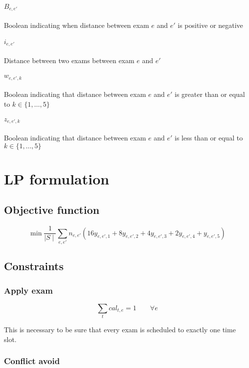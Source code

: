 \documentclass[11pt, a4paper, leqno]{article}
\begin{document}
	\paragraph{$B_{e,e'}$} Boolean indicating when distance between exam $e$ and $e'$ is positive or negative
	
	\paragraph{$i_{e,e'}$} Distance between two exams between exam $e$ and $e'$
	
	\paragraph{$w_{e,e',k}$} Boolean indicating that distance between exam $e$ and $e'$ is greater than or equal to $k \in \{1,\dots,5\}$ %
	
	\paragraph{$z_{e,e',k}$} Boolean indicating that distance between exam $e$ and $e'$ is less than or equal to $k \in \{1,\dots,5\}$
	
	\section{LP formulation}
	
	\subsection{Objective function}
	
	\[
		\min\frac{1}{\mid S\mid}\sum_{e,e'} n_{e,e'}\left(16y_{e,e',1}+8y_{e,e',2}+4y_{e,e',3}+2y_{e,e',4}+y_{e,e',5}\right)
	\]
	
	\subsection{Constraints}
	
	\subsubsection{Apply exam}
	
	\[
		\sum_{t} cal_{t,e} = 1 \qquad\forall e
	\]
	
	This is necessary to be sure that every exam is scheduled to exactly one time slot.
	
	\subsubsection{Conflict avoid}
	
\end{document}

